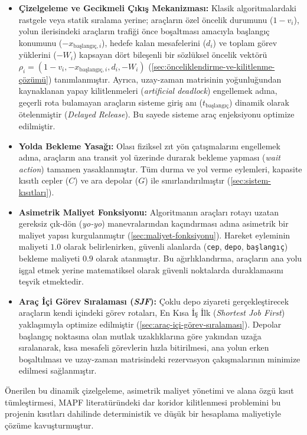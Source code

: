\begin{itemize}
    \item \textbf{Çizelgeleme ve Gecikmeli Çıkış Mekanizması:} Klasik algoritmalardaki rastgele veya statik sıralama yerine; araçların özel öncelik durumunu ($1-v_i$), yolun ilerisindeki araçların trafiği önce boşaltması amacıyla başlangıç konumunu ($-x_{\text{başlangıç}, i}$), hedefe kalan mesafelerini ($d_i$) ve toplam görev yüklerini ($-W_i$) kapsayan dört bileşenli bir sözlüksel öncelik vektörü $\rho_i = (1-v_i, -x_{\text{başlangıç}, i}, d_i, -W_i)$ (\autoref{sec:önceliklendirme-ve-kilitlenme-çözümü}) tanımlanmıştır. Ayrıca, uzay-zaman matrisinin yoğunluğundan kaynaklanan yapay kilitlenmeleri (\textit{artificial deadlock}) engellemek adına, geçerli rota bulamayan araçların sisteme giriş anı ($t_{\text{başlangıç}}$) dinamik olarak ötelenmiştir (\textit{Delayed Release}). Bu sayede sisteme araç enjeksiyonu optimize edilmiştir.
    \item \textbf{Yolda Bekleme Yasağı:} Olası fiziksel zıt yön çatışmalarını engellemek adına, araçların ana transit yol üzerinde durarak bekleme yapması (\textit{wait action}) tamamen yasaklanmıştır. Tüm durma ve yol verme eylemleri, kapasite kısıtlı cepler ($C$) ve ara depolar ($G$) ile sınırlandırılmıştır (\autoref{sec:sistem-kısıtları}).
    
    \item \textbf{Asimetrik Maliyet Fonksiyonu:} Algoritmanın araçları rotayı uzatan gereksiz çık-dön (\textit{yo-yo}) manevralarından kaçındırması adına asimetrik bir maliyet yapısı kurgulanmıştır (\autoref{sec:maliyet-fonksiyonu}). Hareket eyleminin maliyeti $1.0$ olarak belirlenirken, güvenli alanlarda (\texttt{cep}, \texttt{depo}, \texttt{başlangıç}) bekleme maliyeti $0.9$ olarak atanmıştır. Bu ağırlıklandırma, araçların ana yolu işgal etmek yerine matematiksel olarak güvenli noktalarda duraklamasını teşvik etmektedir.
    
    \item \textbf{Araç İçi Görev Sıralaması (\textit{SJF}):} Çoklu depo ziyareti gerçekleştirecek araçların kendi içindeki görev rotaları, En Kısa İş İlk (\textit{Shortest Job First}) yaklaşımıyla optimize edilmiştir (\autoref{sec:araç-içi-görev-sıralaması}). Depolar başlangıç noktasına olan mutlak uzaklıklarına göre yakından uzağa sıralanarak, kısa mesafeli görevlerin hızla bitirilmesi, ana yolun erken boşaltılması ve uzay-zaman matrisindeki rezervasyon çakışmalarının minimize edilmesi sağlanmıştır.
\end{itemize}

Önerilen bu dinamik çizelgeleme, asimetrik maliyet yönetimi ve alana özgü kısıt tümleştirmesi, MAPF literatüründeki dar koridor kilitlenmesi problemini bu projenin kısıtları dahilinde deterministik ve düşük bir hesaplama maliyetiyle çözüme kavuşturmuştur.
